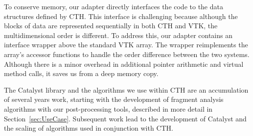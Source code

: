 To conserve memory, our adapter directly interfaces the \vda code to the
data structures defined by CTH.  This interface is challenging because
although the blocks of data are represented sequentially in both CTH and
VTK, the multidimensional order is different.  To address this, our adapter
contains an interface wrapper above the standard VTK array.  The wrapper
reimplements the array's accessor functions to handle the order difference
between the two systems.  Although there is a minor overhead in additional
pointer arithmetic and virtual method calls, it saves us from a deep memory
copy.

The Catalyst library and the algorithms we use within CTH are an
accumulation of several years work, starting with the development of
fragment analysis algorithms with our post-processing
tools, described in more
detail in Section~\ref{sec:UseCase}.  Subsequent work lead to the
development of Catalyst and the scaling of algorithms
used in conjunction with CTH.
